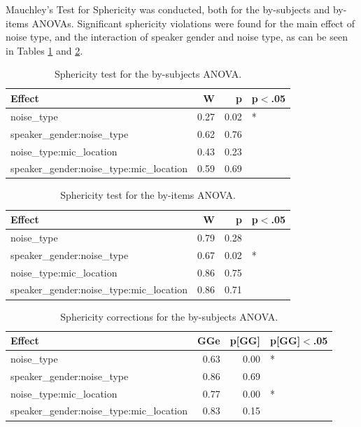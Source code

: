 \documentclass[dissertation,copyright]{uathesis}
\begin{document}
Mauchley's Test for Sphericity was conducted, both for the by-subjects and by-items ANOVAs.  Significant sphericity violations were found for the main effect of noise type, and the interaction of speaker gender and noise type, as can be seen in Tables \ref{tab:anova1_subj_sph_test} and \ref{tab:anova1_item_sph_test}. 

\begin{table}[ht]
\centering
\begin{tabular}{lrrl}
  \hline
Effect & W & p & p$<$.05 \\ 
  \hline
noise\_type & 0.27 & 0.02 & * \\ 
  speaker\_gender:noise\_type & 0.62 & 0.76 &  \\ 
  noise\_type:mic\_location & 0.43 & 0.23 &  \\ 
  speaker\_gender:noise\_type:mic\_location & 0.59 & 0.69 &  \\ 
   \hline
\end{tabular}
\caption{Sphericity test for the by-subjects ANOVA.} 
\label{tab:anova1_subj_sph_test}
\end{table}
\begin{table}[ht]
\centering
\begin{tabular}{lrrl}
  \hline
Effect & W & p & p$<$.05 \\ 
  \hline
noise\_type & 0.79 & 0.28 &  \\ 
  speaker\_gender:noise\_type & 0.67 & 0.02 & * \\ 
  noise\_type:mic\_location & 0.86 & 0.75 &  \\ 
  speaker\_gender:noise\_type:mic\_location & 0.86 & 0.71 &  \\ 
   \hline
\end{tabular}
\caption{Sphericity test for the by-items ANOVA.} 
\label{tab:anova1_item_sph_test}
\end{table}
\begin{table}[ht]
\centering
\begin{tabular}{lrrl}
  \hline
Effect & GGe & p[GG] & p[GG]$<$.05 \\ 
  \hline
noise\_type & 0.63 & 0.00 & * \\ 
  speaker\_gender:noise\_type & 0.86 & 0.69 &  \\ 
  noise\_type:mic\_location & 0.77 & 0.00 & * \\ 
  speaker\_gender:noise\_type:mic\_location & 0.83 & 0.15 &  \\ 
   \hline
\end{tabular}
\caption{Sphericity corrections for the by-subjects ANOVA.} 
\label{tab:anova1_subj_sph_corr}
\end{table}
\end{document}
